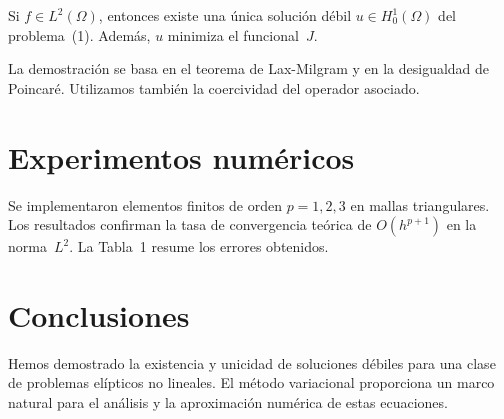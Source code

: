\documentclass{article}
\begin{document}
\begin{theorem}
Si $f \in L^2(\Omega)$, entonces existe una \'unica soluci\'on d\'ebil
$u \in H_0^1(\Omega)$ del problema~(1).  Adem\'as, $u$ minimiza el funcional~$J$.
\end{theorem}

La demostraci\'on se basa en el teorema de Lax-Milgram y en la desigualdad
de Poincar\'e.  Utilizamos tambi\'en la coercividad del operador asociado.

\section{Experimentos num\'ericos}

Se implementaron elementos finitos de orden $p = 1, 2, 3$ en mallas triangulares.
Los resultados confirman la tasa de convergencia te\'orica de $O(h^{p+1})$ en la
norma~$L^2$.  La Tabla~1 resume los errores obtenidos.

\section{Conclusiones}

Hemos demostrado la existencia y unicidad de soluciones d\'ebiles para una clase
de problemas el\'ipticos no lineales.  El m\'etodo variacional proporciona un marco
natural para el an\'alisis y la aproximaci\'on num\'erica de estas ecuaciones.
\end{document}
